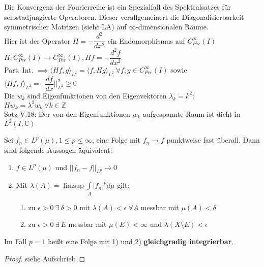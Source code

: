   \begin{remark}
    Die Konvergenz der Fourierreihe ist ein Spezialfall des Spektralsatzes für selbstadjungierte Operatoren. Dieser verallgemeinert die Diagonalisierbarkeit symmetrischer Matrizen (siehe LA) auf $\infty$-dimensionalen Räume.\\
    Hier ist der Operator $H = -\dfrac{d^2}{dx^2}$ ein Endomorphismus auf $C_{Per}^{\infty}(I)$\\
    $H:C_{Per}^{\infty}(I) \to C_{Per}^{\infty}(I), Hf=-\dfrac{d^2f}{dx^2}$\\
    Part. Int. $\implies \langle Hf,g \rangle_{L^2} = \langle f,Hg \rangle_{L^2} \ \forall f,g \in C_{Per}^{\infty}(I)$ sowie $\langle Hf, f \rangle_{L^2} = ||\dfrac{df}{dx}||_{L^2}^2 \geq 0$\\
    Die $w_k$ sind Eigenfunktionen von den Eigenvektoren $\lambda_k = k^2$:\\
    $Hw_k = \lambda^2 w_k \ \forall k \in \mathbb{Z}$\\
    Satz V.18: Der von den Eigenfunktionen $w_k$ aufgespannte Raum ist dicht in $L^2(I, \mathbb{C})$
  \end{remark}

  \begin{theorem}[Vitali]
    Sei $f_n \in L^p(\mu), 1 \leq p \leq \infty$, eine Folge mit $f_n \to f$ punktweise fast überall. Dann sind folgende Aussagen äquivalent:
    \begin{enumerate}[label=\arabic*)]
      \item $f \in L^p(\mu)$ und $||f_n - f||_{L^p} \to 0$
      \item Mit $\lambda(A) = \limsup \int\limits_A |f_n|^p d\mu$ gilt:
            \begin{enumerate}
              \item zu $\epsilon > 0 \ \exists \ \delta > 0$ mit $\lambda(A) < \epsilon \ \forall A$ messbar mit $\mu(A) < \delta$
              \item zu $\epsilon > 0 \ \exists \ E$ messbar mit $\mu(E) < \infty$ und $\lambda(X \setminus E) < \epsilon$ 
            \end{enumerate}
    \end{enumerate}
    Im Fall $p = 1$ heißt eine Folge mit 1) und 2) \textbf{gleichgradig integrierbar}.
  \end{theorem}
  \begin{proof}
    siehe Aufschrieb
  \end{proof}

  
